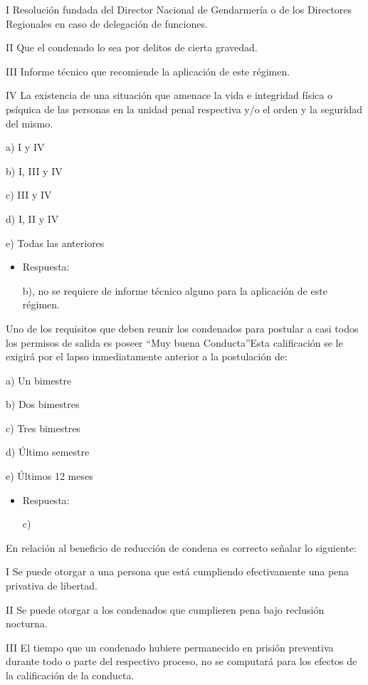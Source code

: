 \documentclass[letterpaper, 11pt]{article}
\begin{document}
I Resolución fundada del Director Nacional de Gendarmería o de los
Directores Regionales en caso de delegación de funciones.

II Que el condenado lo sea por delitos de cierta gravedad.

III Informe técnico que recomiende la aplicación de este régimen.

IV La existencia de una situación que amenace la vida e integridad
física o psíquica de las personas en la unidad penal respectiva y/o el
orden y la seguridad del mismo.


a) I y IV

b) I, III y IV

c) III y IV

d) I, II y IV

e) Todas las anteriores

\begin{itemize}
\item Respuesta:

b), no se requiere de informe técnico alguno para la aplicación de
este régimen.
\end{itemize}


Uno de los requisitos que deben reunir los condenados para postular a
casi todos los permisos de salida es poseer “Muy buena Conducta”Esta
calificación se le exigirá por el lapso inmediatamente anterior a la
postulación de:


a) Un bimestre

b) Dos bimestres

c) Tres bimestres

d) Último semestre

e) Últimos 12 meses

\begin{itemize}
\item Respuesta:

c)
\end{itemize}


En relación al beneficio de reducción de condena es correcto señalar
lo siguiente:

I Se puede otorgar a una persona que está cumpliendo efectivamente una
pena privativa de libertad.

II Se puede otorgar a los condenados que cumplieren pena bajo
reclusión nocturna.

III El tiempo que un condenado hubiere permanecido en prisión
preventiva durante todo o parte del respectivo proceso, no se
computará para los efectos de la calificación de la conducta.
\end{document}

